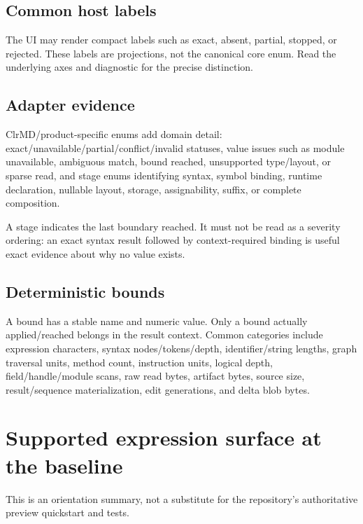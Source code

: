 \documentclass[11pt,oneside,openany]{book}
\newcommand{\status}[1]{\textsf{#1}}
\begin{document}
\section{Common host labels}

The UI may render compact labels such as \status{exact}, \status{absent}, \status{partial}, \status{stopped}, or \status{rejected}. These labels are projections, not the canonical core enum. Read the underlying axes and diagnostic for the precise distinction.

\section{Adapter evidence}

ClrMD/product-specific enums add domain detail: exact/unavailable/partial/conflict/invalid statuses, value issues such as module unavailable, ambiguous match, bound reached, unsupported type/layout, or sparse read, and stage enums identifying syntax, symbol binding, runtime declaration, nullable layout, storage, assignability, suffix, or complete composition.

A stage indicates the last boundary reached. It must not be read as a severity ordering: an exact syntax result followed by context-required binding is useful exact evidence about why no value exists.

\section{Deterministic bounds}

A bound has a stable name and numeric value. Only a bound actually applied/reached belongs in the result context. Common categories include expression characters, syntax nodes/tokens/depth, identifier/string lengths, graph traversal units, method count, instruction units, logical depth, field/handle/module scans, raw read bytes, artifact bytes, source size, result/sequence materialization, edit generations, and delta blob bytes.

\chapter{Supported expression surface at the baseline}
\label{app:expression-surface}

This is an orientation summary, not a substitute for the repository's authoritative preview quickstart and tests.
\end{document}
